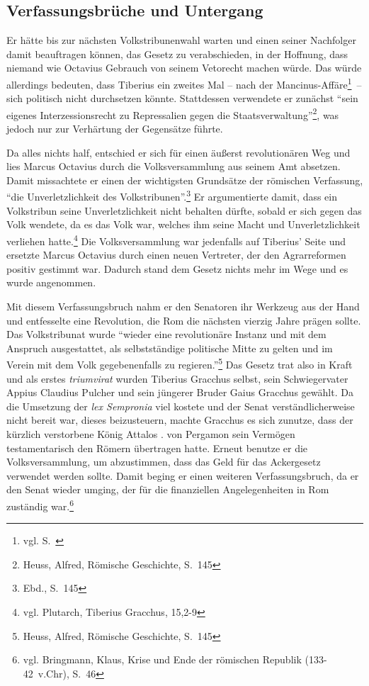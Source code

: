 \documentclass[
    12pt,
    smallheadings,
    ]{scrreprt}
\newcommand{\RM}[1]{\MakeUppercase{\romannumeral #1}}
\begin{document}
        \subsection{Verfassungsbrüche und Untergang}
Er hätte bis zur nächsten Volkstribunenwahl warten und einen seiner Nachfolger damit beauftragen können, das Gesetz zu verabschieden, in der Hoffnung, dass niemand wie Octavius Gebrauch von seinem Vetorecht machen würde.
Das würde allerdings bedeuten, dass Tiberius ein zweites Mal -- nach der Mancinus-Affäre\footnote{vgl. S.~\pageref{mancinus}}~-- sich politisch nicht durchsetzen könnte.
Stattdessen verwendete er zunächst "`sein eigenes Interzessionsrecht zu Repressalien gegen die Staatsverwaltung"'\footnote{Heuss, Alfred, Römische Geschichte, S.~145}, was jedoch nur zur Verhärtung der Gegensätze führte.

Da alles nichts half, entschied er sich für einen äußerst revolutionären Weg und lies Marcus Octavius durch die Volksversammlung aus seinem Amt absetzen.
Damit missachtete er einen der wichtigsten Grundsätze der römischen Verfassung, "`die Unverletzlichkeit des Volkstribunen"'.\footnote{Ebd., S.~145}
\label{octavius}Er argumentierte damit, dass ein Volkstribun seine Unverletzlichkeit nicht behalten dürfte, sobald er sich gegen das Volk wendete, da es das Volk war, welches ihm seine Macht und Unverletzlichkeit verliehen hatte.\footnote{vgl. Plutarch, Tiberius Gracchus, 15,2-9}
Die Volksversammlung war jedenfalls auf Tiberius' Seite und ersetzte Marcus Octavius durch einen neuen Vertreter, der den Agrarreformen positiv gestimmt war.
Dadurch stand dem Gesetz nichts mehr im Wege und es wurde angenommen.

Mit diesem Verfassungsbruch nahm er den Senatoren ihr Werkzeug aus der Hand und entfesselte eine Revolution, die Rom die nächsten vierzig Jahre prägen sollte.
Das Volkstribunat wurde "`wieder eine revolutionäre Instanz und mit dem Anspruch ausgestattet, als selbstständige politische Mitte zu gelten und im Verein mit dem Volk gegebenenfalls zu regieren."'\footnote{Heuss, Alfred, Römische Geschichte, S.~145}
Das Gesetz trat also in Kraft und als erstes \textit{triumvirat} wurden Tiberius Gracchus selbst, sein Schwiegervater Appius Claudius Pulcher und sein jüngerer Bruder Gaius Gracchus gewählt.
Da die Umsetzung der \textit{lex Sempronia} viel kostete und der Senat verständlicherweise nicht bereit war, dieses beizusteuern, machte Gracchus es sich zunutze, dass der kürzlich verstorbene König Attalos \RM{3}. von Pergamon sein Vermögen testamentarisch den Römern übertragen hatte.
Erneut benutze er die Volksversammlung, um abzustimmen, dass das Geld für das Ackergesetz verwendet werden sollte.
Damit beging er einen weiteren Verfassungsbruch, da er den Senat wieder umging, der für die finanziellen Angelegenheiten in Rom zuständig war.\footnote{vgl. Bringmann, Klaus, Krise und Ende der römischen Republik (133-42~v.Chr), S.~46}
\end{document}
